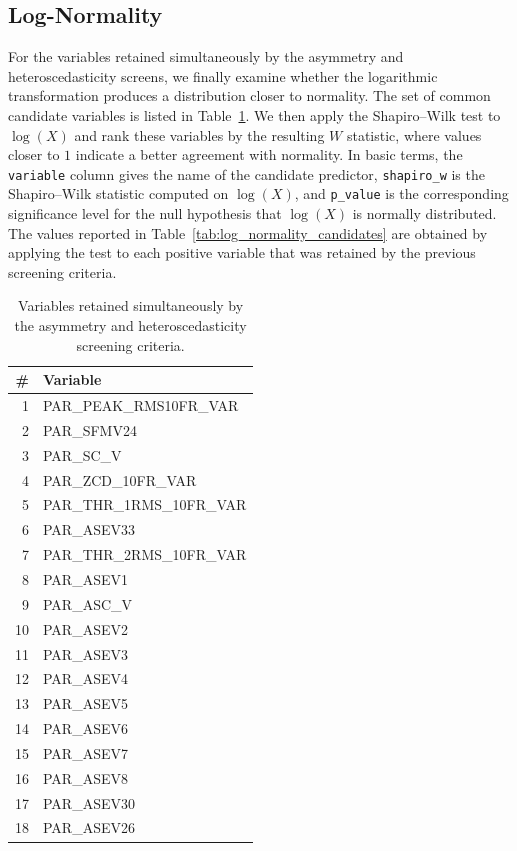 \subsection{Log-Normality}
\label{subsec:log_normality}
For the variables retained simultaneously by the asymmetry and heteroscedasticity screens, we finally examine whether the logarithmic transformation produces a distribution closer to normality. The set of common candidate variables is listed in Table~\ref{tab:common_candidates}. We then apply the Shapiro--Wilk test to \(\log(X)\) and rank these variables by the resulting \(W\) statistic, where values closer to \(1\) indicate a better agreement with normality. In basic terms, the \texttt{variable} column gives the name of the candidate predictor, \texttt{shapiro\_w} is the Shapiro--Wilk statistic computed on \(\log(X)\), and \texttt{p\_value} is the corresponding significance level for the null hypothesis that \(\log(X)\) is normally distributed. The values reported in Table~\ref{tab:log_normality_candidates} are obtained by applying the test to each positive variable that was retained by the previous screening criteria.

\begin{table}[H]
\centering
\caption{Variables retained simultaneously by the asymmetry and heteroscedasticity screening criteria.}
\label{tab:common_candidates}
\scriptsize
\begin{tabular}{rl}
\toprule
\# & Variable \\
\midrule
1 & PAR\_PEAK\_RMS10FR\_VAR \\
2 & PAR\_SFMV24 \\
3 & PAR\_SC\_V \\
4 & PAR\_ZCD\_10FR\_VAR \\
5 & PAR\_THR\_1RMS\_10FR\_VAR \\
6 & PAR\_ASEV33 \\
7 & PAR\_THR\_2RMS\_10FR\_VAR \\
8 & PAR\_ASEV1 \\
9 & PAR\_ASC\_V \\
10 & PAR\_ASEV2 \\
11 & PAR\_ASEV3 \\
12 & PAR\_ASEV4 \\
13 & PAR\_ASEV5 \\
14 & PAR\_ASEV6 \\
15 & PAR\_ASEV7 \\
16 & PAR\_ASEV8 \\
17 & PAR\_ASEV30 \\
18 & PAR\_ASEV26 \\
\bottomrule
\end{tabular}
\end{table}

